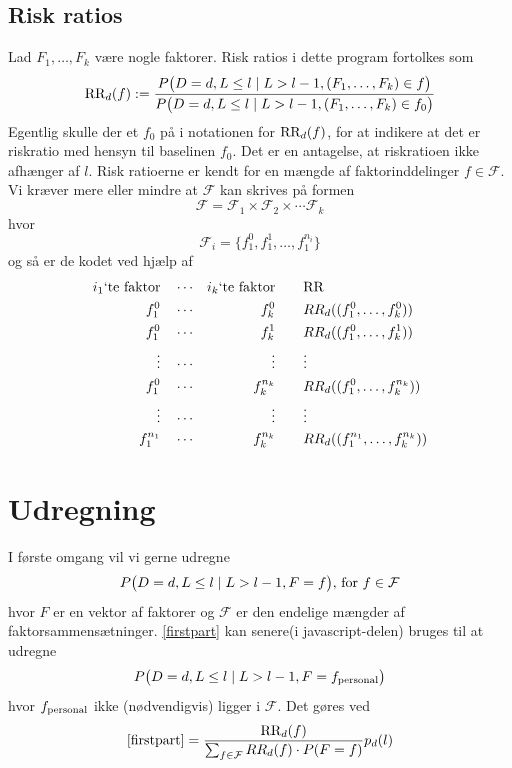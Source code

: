 \documentclass[a4paper, 12pt]{memoir}
\begin{document}
\subsection{Risk ratios}
Lad $F_1, \dots, F_k$ være nogle faktorer. Risk ratios i dette program fortolkes som
\begin{align*}
\textup{RR}_{d}(f):=\frac{P\bigl(D=d, L \leq l \mid L>l-1, (F_1, \dots, F_k)\in f \bigr)}{P\bigl(D=d, L \leq l \mid L>l-1, (F_1, \dots, F_k)\in f_0\bigr)}
\end{align*}
Egentlig skulle der et $f_0$ på i notationen for $\textup{RR}_{d}(f)$, for at indikere at det er riskratio med hensyn til baselinen $f_0$. Det er en antagelse, at riskratioen ikke afhænger af $l$. Risk ratioerne er kendt for en mængde af faktorinddelinger $f\in \mathcal F$. Vi kræver mere eller mindre at $\mathcal F$ kan skrives på formen
\begin{equation*}
\mathcal F=\mathcal F_1 \times \mathcal F_2 \times \cdots \mathcal F_k
\end{equation*}
hvor 
\begin{equation*}
\mathcal F_i = \{f_1^0, f_1^1, \dots, f_1^{n_i}\}
\end{equation*}
og så er de kodet ved hjælp af 
\begin{align*}
 i_1 \textup{`te faktor} \quad& \cdots&  i_k\textup{`te faktor} \qquad& 	\textup{RR}\\
f_1^0 \quad & \cdots& f_k^0 \qquad&  RR_d((f_1^0, \dots, f_k^0))\\
f_1^0 \quad & \cdots& f_k^1 \qquad&  RR_d((f_1^0, \dots, f_k^1))\\
\vdots\quad &\cdots &\vdots \qquad &\vdots\\
f_1^0 \quad & \cdots& f_k^{n_k} \qquad&  RR_d((f_1^0, \dots, f_k^{n_k}))\\
\vdots\quad &\cdots &\vdots \qquad &\vdots\\
f_1^{n_1} \quad & \cdots& f_k^{n_k} \qquad& RR_d((f_1^{n_1}, \dots, f_k^{n_k}))
\end{align*}

\section{Udregning}
I første omgang vil vi gerne udregne
\begin{align}
P\bigl(D=d, L\leq l \mid L>l-1, F=f\bigr), \, \textup{for } f\in \mathcal F \label{firstpart}
\end{align}
hvor $F$ er en vektor af faktorer og $\mathcal F$ er den endelige mængder af faktorsammensætninger. \eqref{firstpart} kan senere(i javascript-delen) bruges til at udregne
\begin{equation}
P\bigl(D=d, L\leq l \mid L>l-1, F=f_{\textup{personal}}\bigr)\label{lastpart}
\end{equation}
hvor $f_{\textup{personal}}$ ikke (nødvendigvis) ligger i $\mathcal F$.
Det gøres ved
\begin{align}
\eqref{firstpart}=\frac{\textup{RR}_{d}(f)}{\sum_{f\in \mathcal F} RR_d(f)\cdot P(F=f)}p_d(l) \label{rr_calc}
\end{align}
\end{document}
